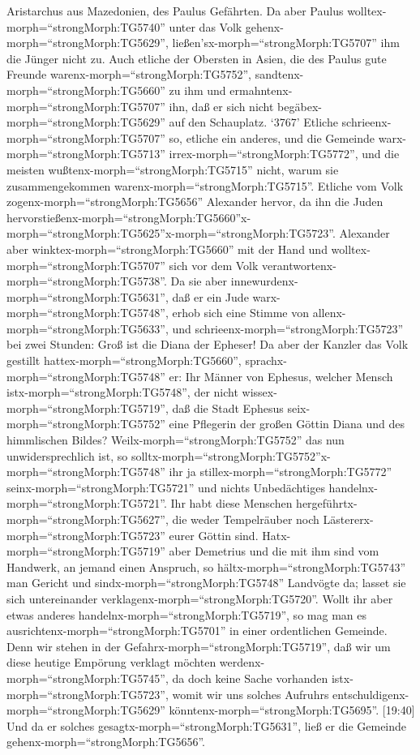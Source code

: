 Aristarchus aus Mazedonien, des Paulus Gefährten.  Da aber
Paulus wolltex-morph=``strongMorph:TG5740'' unter das Volk
gehenx-morph=``strongMorph:TG5629'',
ließen'sx-morph=``strongMorph:TG5707'' ihm die Jünger nicht zu.
 Auch etliche der Obersten in Asien, die des Paulus gute
Freunde warenx-morph=``strongMorph:TG5752'',
sandtenx-morph=``strongMorph:TG5660'' zu ihm und
ermahntenx-morph=``strongMorph:TG5707'' ihn, daß er sich nicht
begäbex-morph=``strongMorph:TG5629'' auf den Schauplatz. 
`3767' Etliche schrieenx-morph=``strongMorph:TG5707'' so, etliche ein
anderes, und die Gemeinde warx-morph=``strongMorph:TG5713''
irrex-morph=``strongMorph:TG5772'', und die meisten
wußtenx-morph=``strongMorph:TG5715'' nicht, warum sie zusammengekommen
warenx-morph=``strongMorph:TG5715''.  Etliche vom Volk
zogenx-morph=``strongMorph:TG5656'' Alexander hervor, da ihn die Juden
hervorstießenx-morph=``strongMorph:TG5660''\textbar x-morph=``strongMorph:TG5625''x-morph=``strongMorph:TG5723''.
Alexander aber winktex-morph=``strongMorph:TG5660'' mit der Hand und
wolltex-morph=``strongMorph:TG5707'' sich vor dem Volk
verantwortenx-morph=``strongMorph:TG5738''.  Da sie aber
innewurdenx-morph=``strongMorph:TG5631'', daß er ein Jude
warx-morph=``strongMorph:TG5748'', erhob sich eine Stimme von
allenx-morph=``strongMorph:TG5633'', und
schrieenx-morph=``strongMorph:TG5723'' bei zwei Stunden: Groß ist die
Diana der Epheser!  Da aber der Kanzler das Volk gestillt
hattex-morph=``strongMorph:TG5660'',
sprachx-morph=``strongMorph:TG5748'' er: Ihr Männer von Ephesus, welcher
Mensch istx-morph=``strongMorph:TG5748'', der nicht
wissex-morph=``strongMorph:TG5719'', daß die Stadt Ephesus
seix-morph=``strongMorph:TG5752'' eine Pflegerin der großen Göttin Diana
und des himmlischen Bildes? 
Weilx-morph=``strongMorph:TG5752'' das nun unwidersprechlich ist, so
solltx-morph=``strongMorph:TG5752''x-morph=``strongMorph:TG5748'' ihr ja
stillex-morph=``strongMorph:TG5772'' seinx-morph=``strongMorph:TG5721''
und nichts Unbedächtiges handelnx-morph=``strongMorph:TG5721''.
 Ihr habt diese Menschen
hergeführtx-morph=``strongMorph:TG5627'', die weder Tempelräuber noch
Lästererx-morph=``strongMorph:TG5723'' eurer Göttin sind. 
Hatx-morph=``strongMorph:TG5719'' aber Demetrius und die mit ihm sind
vom Handwerk, an jemand einen Anspruch, so
hältx-morph=``strongMorph:TG5743'' man Gericht und
sindx-morph=``strongMorph:TG5748'' Landvögte da; lasset sie sich
untereinander verklagenx-morph=``strongMorph:TG5720''. 
Wollt ihr aber etwas anderes handelnx-morph=``strongMorph:TG5719'', so
mag man es ausrichtenx-morph=``strongMorph:TG5701'' in einer
ordentlichen Gemeinde.  Denn wir stehen in der
Gefahrx-morph=``strongMorph:TG5719'', daß wir um diese heutige Empörung
verklagt möchten werdenx-morph=``strongMorph:TG5745'', da doch keine
Sache vorhanden istx-morph=``strongMorph:TG5723'', womit wir uns solches
Aufruhrs entschuldigenx-morph=``strongMorph:TG5629''
könntenx-morph=``strongMorph:TG5695''.  {[}19:40{]} Und da
er solches gesagtx-morph=``strongMorph:TG5631'', ließ er die Gemeinde
gehenx-morph=``strongMorph:TG5656''.

